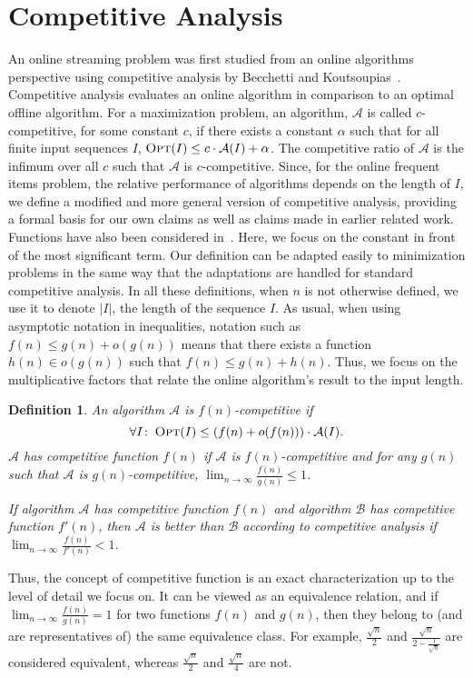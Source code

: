 \documentclass[11pt]{article}
\newtheorem{xdefinition}{Definition}
\newenvironment{definition}{\begin{xdefinition}\rm}{\hspace*{\fill}\raisebox{-1pt}{\boldmath$\Box$}\end{xdefinition}}
\newcommand{\opt}{{\ensuremath{\textsc{Opt}}}\xspace}
\newcommand{\algA}{{\ensuremath{\mathcal{A}}}\xspace}
\newcommand{\algB}{{\ensuremath{\mathcal{B}}}\xspace}
\newcommand{\WEHAVE}{\!:\;}
\begin{document}
\section{Competitive Analysis}\label{sec:comp}
An online streaming problem was first studied from an online algorithms
perspective using competitive analysis by Becchetti and 
Koutsoupias~\cite{Becchetti09}.
Competitive analysis\cite{ST85,KMRS88} evaluates an online algorithm in comparison to an optimal offline algorithm.
For a maximization problem, an algorithm, \algA is called $c$-competitive,
for some constant $c$, if there exists a constant $\alpha$ such that for all finite input sequences $I$, $\opt(I) \leq c\cdot \algA(I) +\alpha$.
The competitive ratio of \algA is the infimum over all $c$ such that \algA is $c$-competitive.
Since, for the online frequent items problem, the relative performance of algorithms depends on the length of $I$, we define
a modified and more general version of competitive analysis,
providing a formal basis for our own claims as well as claims made in
earlier related work.
Functions have also been considered in~\cite{DorrigivL05}.
Here, we focus on the constant in front of the most significant term.
Our definition can be adapted easily to minimization problems in the same
way that the adaptations are handled for standard competitive analysis.
In all these definitions, when $n$ is not otherwise defined,
we use it to denote $|I|$, the length of the
sequence $I$. As usual, when using asymptotic notation in inequalities,
notation such as $f(n) \leq g(n) + o(g(n))$ means that there exists a
function $h(n)\in o(g(n))$ such that $f(n) \leq g(n) + h(n)$.
Thus, we focus on the multiplicative factors that relate the online
algorithm's result to the input length.

\begin{definition} \label{def:com}
An algorithm \algA is $f(n)$-{\em competitive} if
\[\forall I\WEHAVE \opt(I) \leq (f(n)+o(f(n)))\cdot\algA(I).\]
\algA has {\em competitive function} $f(n)$ if \algA is
$f(n)$-{\em competitive} and for any $g(n)$ such that \algA
is $g(n)$-{\em competitive},
$\lim_{n \rightarrow  \infty}\frac{f(n)}{g(n)} \leq 1$.

If algorithm \algA has {\em competitive function} $f(n)$ and algorithm \algB has {\em competitive function} $f'(n)$, then \algA is better than \algB according to competitive analysis if
$\lim_{n \rightarrow  \infty}\frac{f(n)}{f'(n)} < 1$.
\end{definition}


Thus, the concept of competitive function is an exact characterization
up to the level of detail we focus on. It can be viewed as an
equivalence relation, and if $\lim_{n\rightarrow\infty}\frac{f(n)}{g(n)}=1$ for two
functions $f(n)$ and $g(n)$, then they belong to (and are representatives of)
the same equivalence class. For example,
$\frac{\sqrt{n}}{2}$ and $\frac{\sqrt{n}}{2-\frac{1}{\sqrt{n}}}$ are
considered equivalent,
whereas $\frac{\sqrt{n}}{2}$ and $\frac{\sqrt{n}}{4}$ are not.
\end{document}
